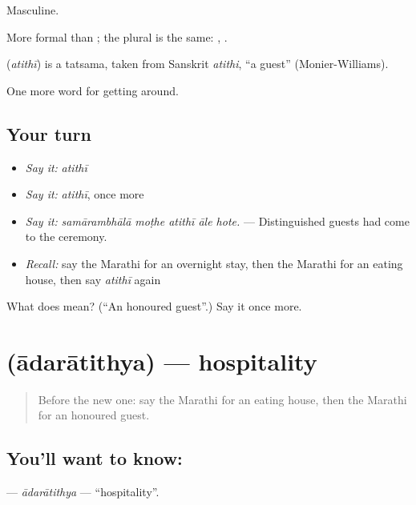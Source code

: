 Masculine.

More formal than ; the plural is the same:  ,  .

\begin{cousinweb}
\textbf{} (\emph{atithī}) is a tatsama, taken from Sanskrit \emph{atithi}, \textquotedblleft{}a guest\textquotedblright{} (Monier-Williams).
\end{cousinweb}

\begin{grammarlens}[title={What you've built}]
One more word for getting around.
\end{grammarlens}

\subsection*{Your turn}
\begin{itemize}
\raggedright
  \item \emph{Say it:} \emph{atithī}
  \item \emph{Say it:} \emph{atithī}, once more
  \item \emph{Say it:} \emph{samārambhālā moṭhe atithī āle hote.} — Distinguished guests had come to the ceremony.
  \item \emph{Recall:} say the Marathi for an overnight stay, then the Marathi for an eating house, then say \emph{atithī} again
\end{itemize}

\begin{tcolorbox}[breakable,colback=teal!4,colframe=teal!35!black,title={Before you move on}]
What does  mean? (\textquotedblleft{}An honoured guest\textquotedblright{}.) Say it once more.
\end{tcolorbox}
\section[\texorpdfstring{\mr{आदरातिथ्य} (ādarātithya)}{आदरातिथ्य (ādarātithya)}]{ (ādarātithya) — hospitality}

\label{lesson:MR-C414-adaratithya}



\begin{quote}
Before the new one: say the Marathi for an eating house, then the Marathi for an honoured guest.
\end{quote}

\subsection*{You'll want to know: }
\textbf{} — \emph{ādarātithya} — \textquotedblleft{}hospitality\textquotedblright{}.

